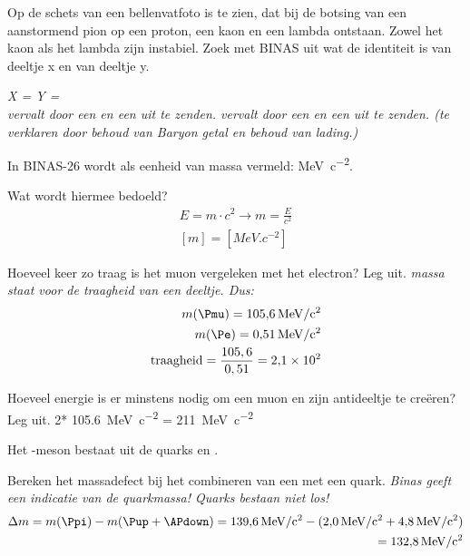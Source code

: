 \begin{opdrachten}
\item  Op de schets van een bellenvatfoto is te zien, dat bij de botsing
van een aanstormend pion op een proton, een kaon en een lambda ontstaan.
Zowel het kaon als het lambda zijn instabiel. Zoek met BINAS uit wat de
identiteit is van deeltje x en van deeltje y.

    \textit{ X = \Ppiplus Y = \Pp \\ \PKzero vervalt door een \Ppiplus en 
    een \Ppiminus uit te zenden. \PLambda vervalt door een \Ppiminus en 
    een \Pp uit te zenden. (te verklaren door behoud van Baryon getal en 
    behoud van lading.)}

\item In BINAS-26 wordt als eenheid van massa vermeld: \si{MeV.c^{-2}}.
    \begin{opdrachten} 
    \item  Wat wordt hiermee bedoeld?
    \begin{eqnarray*}
        E = m \cdot c^2 \rightarrow m = \frac{E}{c^2} \\
        \left[m\right] = \left[ \si{MeV.c^{-2}} \right]
    \end{eqnarray*}

    \item Hoeveel keer zo traag is het muon vergeleken met het electron? Leg uit.
    \textit{ massa staat voor de traagheid van een deeltje. Dus: }
    \begin{eqnarray*} 
    m(\Pmu) = \SI{105,6}{\mega\electronvolt\per c\squared}\\ m(\Pe) =
    \SI{0.51}{\mega\electronvolt\per c\squared}\\ \text{traagheid} =
    \frac{105,6}{0,51} = \SI{2,1e2}{} 
    \end{eqnarray*} 
    
    \item Hoeveel energie is er minstens nodig om een muon en zijn antideeltje 
    te creëren? Leg uit. 
    2* \SI{105,6}{\mega\electronvolt\per c\squared} = \SI{211}{\mega\electronvolt\per c\squared}
    \end{opdrachten} 

\item Het \Ppiplus-meson bestaat uit de quarks \Pup en \APdown.
    \begin{opdrachten} 
    \item Bereken het massadefect bij het combineren van een \Pup met een \APdown quark.
    \emph{Binas geeft een indicatie van de quarkmassa! Quarks bestaan niet los!}
    \begin{eqnarray*}
     \Delta m = m(\Ppi) - m(\Pup + \APdown) = \SI{139.6}{\mega\electronvolt\per c\squared}
    - (\SI{2.0}{\mega\electronvolt\per c\squared} + 
    \SI{4.8}{\mega\electronvolt\per c\squared}) \\= \SI{132.8}{\mega\electronvolt\per c\squared}
    \end{eqnarray*}
    

\end{opdrachten}
\end{opdrachten}
